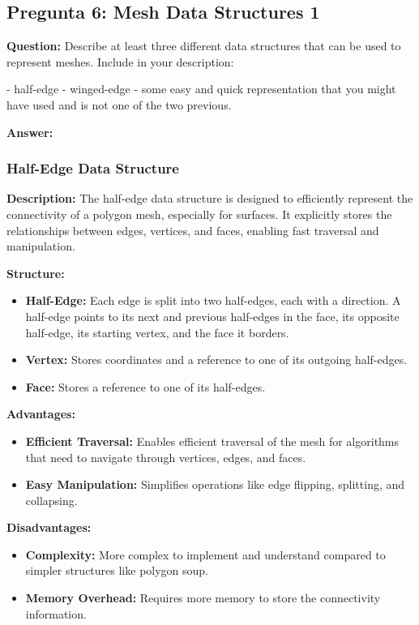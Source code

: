 \documentclass{article}
\begin{document}
\subsection{Pregunta 6: Mesh Data Structures 1}

\textbf{Question:} Describe at least three different data structures that can be used to represent meshes. Include in your description:

- half-edge
- winged-edge
- some easy and quick representation that you might have used and is not one of the two previous.

\textbf{Answer:}

\subsubsection{Half-Edge Data Structure}

\textbf{Description:} The half-edge data structure is designed to efficiently represent the connectivity of a polygon mesh, especially for surfaces. It explicitly stores the relationships between edges, vertices, and faces, enabling fast traversal and manipulation.

\textbf{Structure:}

\begin{itemize}
    \item \textbf{Half-Edge:} Each edge is split into two half-edges, each with a direction. A half-edge points to its next and previous half-edges in the face, its opposite half-edge, its starting vertex, and the face it borders.
    \item \textbf{Vertex:} Stores coordinates and a reference to one of its outgoing half-edges.
    \item \textbf{Face:} Stores a reference to one of its half-edges.
\end{itemize}

\textbf{Advantages:}

\begin{itemize}
    \item \textbf{Efficient Traversal:} Enables efficient traversal of the mesh for algorithms that need to navigate through vertices, edges, and faces.
    \item \textbf{Easy Manipulation:} Simplifies operations like edge flipping, splitting, and collapsing.
\end{itemize}

\textbf{Disadvantages:}

\begin{itemize}
    \item \textbf{Complexity:} More complex to implement and understand compared to simpler structures like polygon soup.
    \item \textbf{Memory Overhead:} Requires more memory to store the connectivity information.
\end{itemize}
\end{document}

